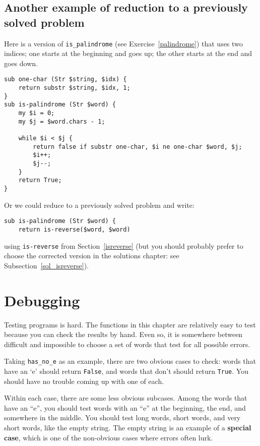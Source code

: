 \subsection{Another example of reduction to a previously solved problem}

\label{palindrome_2}
Here is a version of \verb"is_palindrome" (see
Exercise~\ref{palindrome}) that uses two indices; one starts at the
beginning and goes up; the other starts at the end and goes down.

\begin{verbatim}
sub one-char (Str $string, $idx) {
    return substr $string, $idx, 1;
}
sub is-palindrome (Str $word) {
    my $i = 0;
    my $j = $word.chars - 1;

    while $i < $j {
        return false if substr one-char, $i ne one-char $word, $j;
        $i++;
        $j--;
    }
    return True;
}
\end{verbatim}

Or we could reduce to a previously solved
problem and write:

\begin{verbatim}
sub is-palindrome (Str $word) {
    return is-reverse($word, $word)
\end{verbatim}
%
using \verb"is-reverse" from Section~\ref{isreverse} (but
you should probably prefer to choose the corrected version 
in the solutions chapter: see Subsection~\ref{sol_isreverse}).


\section{Debugging}

Testing programs is hard.  The functions in this chapter are
relatively easy to test because you can check the results by hand.
Even so, it is somewhere between difficult and impossible to choose a
set of words that test for all possible errors.

Taking \verb"has_no_e" as an example, there are two obvious
cases to check: words that have an `e' should return {\tt False}, and
words that don't should return {\tt True}.  You should have no
trouble coming up with one of each.

Within each case, there are some less obvious subcases.  Among the
words that have an ``e'', you should test words with an ``e'' at the
beginning, the end, and somewhere in the middle.  You should test long
words, short words, and very short words, like the empty string.  The
empty string is an example of a {\bf special case}, which is one of
the non-obvious cases where errors often lurk.

